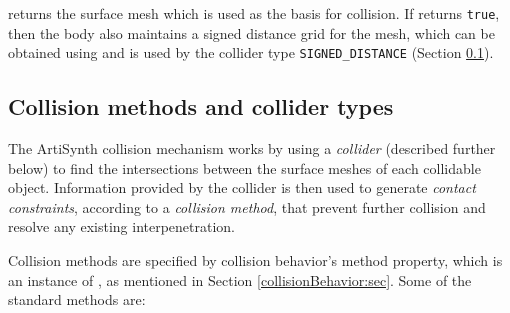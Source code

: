returns the surface mesh which is used as the basis for collision.  If
returns {\tt true}, then the body also maintains a signed distance
grid for the mesh, which can be obtained using
 and
is used by the collider type {\tt SIGNED\_DISTANCE} (Section
\ref{CollisionMethods:sec}).

\subsection{Collision methods and collider types}
\label{CollisionMethods:sec}

The ArtiSynth collision mechanism works by using a {\it collider}
(described further below) to find the intersections between the
surface meshes of each collidable object. Information provided
by the collider is then used to generate {\it contact constraints},
according to a {\it collision method}, that prevent further collision
and resolve any existing interpenetration.

Collision methods are specified by collision behavior's {\sf method}
property, which is an instance of
, as
mentioned in Section \ref{collisionBehavior:sec}.  Some of the
standard methods are:

